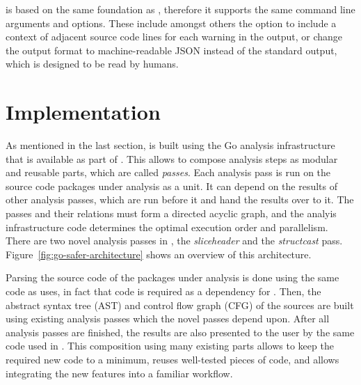 

\toolSafer{} is based on the same foundation as \toolVet{}, therefore it supports the same command line arguments and
options.
These include amongst others the option to include a context of adjacent source code lines for each warning in the
output, or change the output format to machine-readable JSON instead of the standard output, which is designed to be
read by humans.



\section{Implementation}\label{sec:go-safer:implementation}

As mentioned in the last section, \toolSafer{} is built using the Go analysis infrastructure that is available as part
of \toolVet{}.
This allows to compose analysis steps as modular and reusable parts, which are called \textit{passes}.
Each analysis pass is run on the source code packages under analysis as a unit.
It can depend on the results of other analysis passes, which are run before it and hand the results over to it.
The passes and their relations must form a directed acyclic graph, and the analyis infrastructure code determines the
optimal execution order and parallelism.
There are two novel analysis passes in \toolSafer{}, the \textit{sliceheader} and the \textit{structcast} pass.
Figure~\ref{fig:go-safer-architecture} shows an overview of this architecture.



Parsing the source code of the packages under analysis is done using the same code as \toolVet{} uses, in fact that code
is required as a dependency for \toolSafer{}.
Then, the abstract syntax tree (\acrshort{AST}) and control flow graph (\acrshort{CFG}) of the sources are built using
existing analysis passes which the novel \toolSafer{} passes depend upon.
After all analysis passes are finished, the results are also presented to the user by the same code used in \toolVet{}.
This composition using many existing parts allows to keep the required new code to a minimum, reuses well-tested pieces
of code, and allows integrating the new \toolSafer{} features into a familiar workflow.

